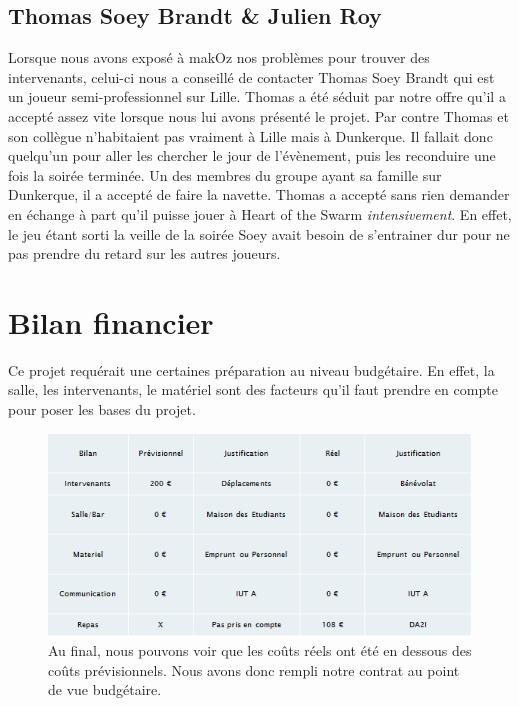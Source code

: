\subsection{Thomas \og Soey \fg{} Brandt \& Julien Roy}%
\label{sub:thomas_soey_brandt_&_julien_roy}

Lorsque nous avons exposé à makOz nos problèmes pour trouver des intervenants,
celui-ci nous a conseillé de contacter Thomas \og Soey \fg{} Brandt qui
est un joueur semi-professionnel sur Lille. Thomas a été séduit par
notre offre qu'il a accepté assez vite lorsque nous lui avons présenté
le projet. Par contre Thomas et son collègue n'habitaient pas vraiment à
Lille mais à Dunkerque. Il fallait donc quelqu'un pour aller les
chercher le jour de l'évènement, puis les reconduire une fois la soirée
terminée. Un des membres du groupe ayant sa famille sur Dunkerque, il a
accepté de faire la navette. Thomas a accepté sans rien demander en
échange à part qu'il puisse jouer à Heart of the Swarm
\emph{intensivement}.
En effet, le jeu étant sorti la veille de la soirée Soey avait besoin
de s'entrainer dur pour ne pas prendre du retard sur les autres joueurs.


\section{Bilan financier}%
\label{sec:bilan_financier}

Ce projet requérait une certaines préparation au niveau budgétaire. En
effet, la salle, les intervenants, le matériel sont des facteurs qu'il
faut prendre en compte pour poser les bases du projet.

\begin{figure}[h]
  \begin{center}
    \includegraphics[scale=1]{images/bilan_financier.png}
    \caption{Au final, nous pouvons voir que les coûts réels ont été en
dessous des coûts prévisionnels. Nous avons donc rempli notre contrat au
point de vue budgétaire.}
    \label{char3}
  \end{center}
\end{figure}

